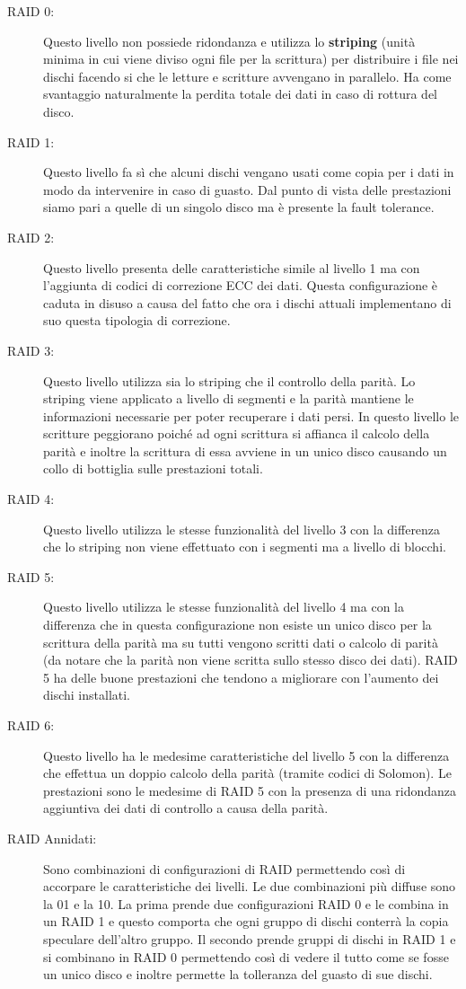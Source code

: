 \begin{description} 
  \item[RAID 0:]Questo livello non possiede ridondanza e utilizza lo \textbf{striping} (unità minima in cui viene diviso ogni file per la scrittura) per distribuire i file nei dischi facendo si che le letture e scritture avvengano in parallelo. Ha come svantaggio naturalmente la perdita totale dei dati in caso di rottura del disco.
  \item[RAID 1:]Questo livello fa sì che alcuni dischi vengano usati come copia per i dati in modo da intervenire in caso di guasto. Dal punto di vista delle prestazioni siamo pari a quelle di un singolo disco ma è presente la fault tolerance.
  \item[RAID 2:] Questo livello presenta delle caratteristiche simile al livello 1 ma con l'aggiunta di codici di correzione ECC dei dati. Questa configurazione è caduta in disuso a causa del fatto che ora i dischi attuali implementano di suo questa tipologia di correzione.
  \item[RAID 3:] Questo livello utilizza sia lo striping che il controllo della parità. Lo striping viene applicato a livello di segmenti e la parità mantiene le informazioni necessarie per poter recuperare i dati persi. In questo livello le scritture peggiorano poiché ad ogni scrittura si affianca il calcolo della parità e inoltre la scrittura di essa avviene in un unico disco causando un collo di bottiglia sulle prestazioni totali.
  \item[RAID 4:] Questo livello utilizza le stesse funzionalità del livello 3 con la differenza che lo striping non viene effettuato con i segmenti ma a livello di blocchi.
  \item[RAID 5:] Questo livello utilizza le stesse funzionalità del livello 4 ma con la differenza che in questa configurazione non esiste un unico disco per la scrittura della parità ma su tutti vengono scritti dati o calcolo di parità (da notare che la parità non viene scritta sullo stesso disco dei dati). RAID 5 ha delle buone prestazioni che tendono a migliorare con l'aumento dei dischi installati.
  \item[RAID 6:] Questo livello ha le medesime caratteristiche del livello 5 con la differenza che effettua un doppio calcolo della parità (tramite codici di Solomon). Le prestazioni sono le medesime di RAID 5 con la presenza di una ridondanza aggiuntiva dei dati di controllo a causa della parità.
  \item[RAID Annidati:] Sono combinazioni di configurazioni di RAID permettendo così di accorpare le caratteristiche dei livelli. Le due combinazioni più diffuse sono la 01 e la 10. La prima prende due configurazioni RAID 0 e le combina in un RAID 1 e questo comporta che ogni gruppo di dischi conterrà la copia speculare dell'altro gruppo. Il secondo prende gruppi di dischi in RAID 1 e si combinano in RAID 0 permettendo così di vedere il tutto come se fosse un unico disco e inoltre permette la tolleranza del guasto di sue dischi.
\end{description}
